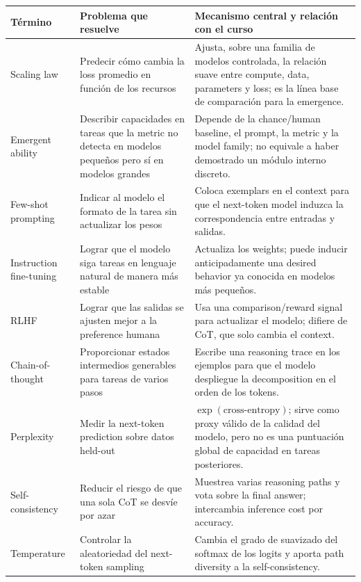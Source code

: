 \documentclass[a4paper]{article}
\begin{document}
\begin{longtable}{L{0.19\textwidth}L{0.32\textwidth}L{0.40\textwidth}}
\toprule
\textbf{Término} & \textbf{Problema que resuelve} & \textbf{Mecanismo central y relación con el curso} \\
\midrule
\endhead
Scaling law & Predecir cómo cambia la loss promedio en función de los recursos & Ajusta, sobre una familia de modelos controlada, la relación suave entre compute, data, parameters y loss; es la línea base de comparación para la emergence. \\
Emergent ability & Describir capacidades en tareas que la metric no detecta en modelos pequeños pero sí en modelos grandes & Depende de la chance/human baseline, el prompt, la metric y la model family; no equivale a haber demostrado un módulo interno discreto. \\
Few-shot prompting & Indicar al modelo el formato de la tarea sin actualizar los pesos & Coloca exemplars en el context para que el next-token model induzca la correspondencia entre entradas y salidas. \\
Instruction fine-tuning & Lograr que el modelo siga tareas en lenguaje natural de manera más estable & Actualiza los weights; puede inducir anticipadamente una desired behavior ya conocida en modelos más pequeños. \\
RLHF & Lograr que las salidas se ajusten mejor a la preference humana & Usa una comparison/reward signal para actualizar el modelo; difiere de CoT, que solo cambia el context. \\
Chain-of-thought & Proporcionar estados intermedios generables para tareas de varios pasos & Escribe una reasoning trace en los ejemplos para que el modelo despliegue la decomposition en el orden de los tokens. \\
Perplexity & Medir la next-token prediction sobre datos held-out & $\exp(\text{cross-entropy})$; sirve como proxy válido de la calidad del modelo, pero no es una puntuación global de capacidad en tareas posteriores. \\
Self-consistency & Reducir el riesgo de que una sola CoT se desvíe por azar & Muestrea varias reasoning paths y vota sobre la final answer; intercambia inference cost por accuracy. \\
Temperature & Controlar la aleatoriedad del next-token sampling & Cambia el grado de suavizado del softmax de los logits y aporta path diversity a la self-consistency. \\
\bottomrule
\end{longtable}
\end{document}
